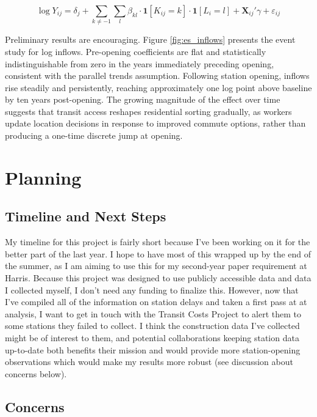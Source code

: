 \documentclass[12pt]{article}
\begin{document}
$$\log Y_{ij} = \delta_j + \sum_{k \neq -1} \sum_l \beta_{kl} \cdot \mathbf{1}[K_{ij} = k] \cdot \mathbf{1}[L_i = l] + \mathbf{X}_{ij}'\gamma + \varepsilon_{ij}$$

Preliminary results are encouraging. Figure \ref{fig:es_inflows} presents the event study for log inflows. Pre-opening coefficients are flat and statistically indistinguishable from zero in the years immediately preceding opening, consistent with the parallel trends assumption. Following station opening, inflows rise steadily and persistently, reaching approximately one log point above baseline by ten years post-opening. The growing magnitude of the effect over time suggests that transit access reshapes residential sorting gradually, as workers update location decisions in response to improved commute options, rather than producing a one-time discrete jump at opening.

\section{Planning}
\subsection{Timeline and Next Steps}
My timeline for this project is fairly short because I've been working on it for the better part of the last year. I hope to have most of this wrapped up by the end of the summer, as I am aiming to use this for my second-year paper requirement at Harris. Because this project was designed to use publicly accessible data and data I collected myself, I don't need any funding to finalize this. However, now that I've compiled all of the information on station delays and taken a first pass at at analysis, I want to get in touch with the Transit Costs Project to alert them to some stations they failed to collect. I think the construction data I've collected might be of interest to them, and potential collaborations keeping station data up-to-date both benefits their mission and would provide more station-opening observations which would make my results more robust (see discussion about concerns below). 

\subsection{Concerns}
\end{document}
